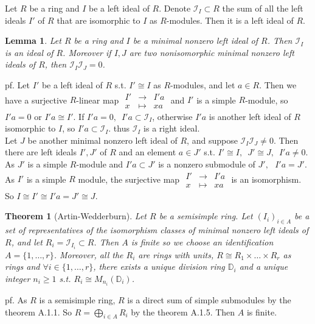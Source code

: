 \documentclass[12pt,letterpaper]{report}
\newtheorem{lemma}{Lemma}[section]
\newtheorem{theorem}{Theorem}[section]
\begin{document}
Let $R$ be a ring and $I$ be a left ideal of $R$. Denote $\mathcal{I}_{I}\subset R$ the sum of all the left ideals $I'$ of $R$ that are isomorphic to $I$ as $R$-modules. Then it is a left ideal of $R$. 
\begin{lemma}Let $R$ be a ring and $I$ be a minimal nonzero left ideal of $R$. Then $\mathcal{I}_{I}$ is an ideal of $R$. Moreover if $I,J$ are two nonisomorphic minimal nonzero left ideals of $R$, then $\mathcal{I}_{I}\mathcal{I}_{J}=0$.\end{lemma}
pf. Let $I'$ be a left ideal of $R$ s.t. $I'\cong I$ as $R$-modules, and let $a\in R$. Then we have a surjective $R$-linear map $\begin{array}{rrr}I'&\rightarrow& I'a\\x&\mapsto&xa\end{array}$ and $I'$ is a simple $R$-module, so $I'a=0$ or $I'a\cong I'$. If $I'a=0,\,\,\,I'a\subset\mathcal{I}_{I}$, otherwise $I'a$ is another left ideal of $R$ isomorphic to $I$, so $I'a\subset\mathcal{I}_{I}$. thus $\mathcal{I}_{I}$ is a right ideal. 
\\Let $J$ be another minimal nonzero left ideal of $R$, and suppose $\mathcal{I}_{I}\mathcal{I}_{J}\neq0$. Then there are left ideals $I',J'$ of $R$ and an element $a\in J'$ s.t. $I'\cong I,\,\,\,J'\cong J,\,\,\,I'a\neq 0$. As $J'$ is a simple $R$-module and $I'a\subset J'$ is a nonzero submodule of $J',\,\,\,\,I'a=J'$. As $I'$ is a simple $R$ module, the surjective map $\begin{array}{rrr}I'&\rightarrow&I'a\\x&\mapsto&xa\end{array}$ is an isomorphism. So $I\cong I'\cong I'a=J'\cong J$. 
\begin{theorem}[Artin-Wedderburn] Let $R$ be a semisimple ring. Let $(I_{i})_{i\in A}$ be a set of representatives of the isomorphism classes of minimal nonzero left ideals of $R$, and let $R_{i}=\mathcal{I}_{I_{i}}\subset R$. Then $A$ is finite so we choose an identification $A=\{1,\dots,r\}$. Moreover, all the $R_{i}$ are rings with units, $R\cong R_{1}\times\dots\times R_{r}$ as rings and $\forall i\in\{1,\dots,r\}$, there exists a unique division ring $\mathbb{D}_{i}$ and a unique integer $n_{i}\geq1$ s.t. $R_{i}\cong M_{n_{i}}(\mathbb{D}_{i})$.\end{theorem}
pf. As $R$ is a semisimple ring, $R$ is a direct sum of simple submodules by the theorem A.1.1. So $R=\bigoplus_{i\in A}R_{i}$ by the theorem A.1.5. Then $A$ is finite. 
\end{document}
